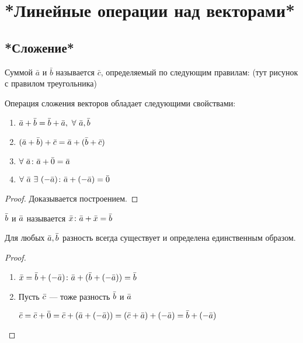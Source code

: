 \chapter{*Линейные операции над векторами*}
\section{*Сложение*}
\begin{opred}
Суммой $\bar{a}$ и $\bar{b}$ называется $\bar{c}$, определяемый по следующим правилам: (тут рисунок с правилом треугольника)
\end{opred}
\begin{theor}
Операция сложения векторов обладает следующими свойствами: \begin{enumerate}
\item $\va+\vb=\vb+\va,\ \forall\ \va,\vb$
\item $(\bar{a}+\bar{b})+\bar{c}=\bar{a}+(\bar{b}+\bar{c})$
\item $\forall\ \va\colon\va+\vo=\va$
\item $\forall\ \va\ \exists\ (-\va)\colon\va+(-\va)=\vo$
\end{enumerate}
\end{theor}
\begin{proof}
Доказывается построением.
\end{proof}
\begin{opred}
 $\bar{b}$ и $\bar{a}$ называется $\bar{x}\colon\bar{a}+\bar{x}=\bar{b}$
\end{opred}
\begin{remark}
Для любых $\bar{a},\bar{b}$ разность всегда существует и определена единственным образом.
\end{remark}
\begin{proof}\begin{enumerate}
\item $\bar{x}=\bar{b}+(-\bar{a})\colon\bar{a}+(\bar{b}+(-\bar{a}))=\bar{b}$
\item Пусть $\bar{c}$ --- тоже разность $\bar{b}$ и $\bar{a}$

$\bar{c}=\bar{c}+\bar{0}=\bar{c}+(\bar{a}+(-\bar{a}))=(\bar{c}+\bar{a})+(-\bar{a})=\bar{b}+(-\bar{a})$
\end{enumerate}\end{proof}
